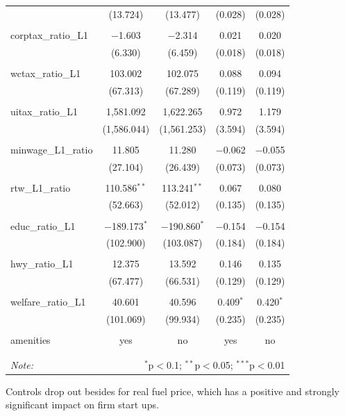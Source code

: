 \documentclass{beamer}
\begin{document}
\begin{frame}
\begin{table}[!htbp]
{{\begin{tabular}{@{\extracolsep{5pt}}lcccc}
  & (13.724) & (13.477) & (0.028) & (0.028) \\ 
  & & & & \\ 
 corptax\_ratio\_L1 & $-$1.603 & $-$2.314 & 0.021 & 0.020 \\ 
  & (6.330) & (6.459) & (0.018) & (0.018) \\ 
  & & & & \\ 
 wctax\_ratio\_L1 & 103.002 & 102.075 & 0.088 & 0.094 \\ 
  & (67.313) & (67.289) & (0.119) & (0.119) \\ 
  & & & & \\ 
 uitax\_ratio\_L1 & 1,581.092 & 1,622.265 & 0.972 & 1.179 \\ 
  & (1,586.044) & (1,561.253) & (3.594) & (3.594) \\ 
  & & & & \\ 
 minwage\_L1\_ratio & 11.805 & 11.280 & $-$0.062 & $-$0.055 \\ 
  & (27.104) & (26.439) & (0.073) & (0.073) \\ 
  & & & & \\ 
 rtw\_L1\_ratio & 110.586$^{**}$ & 113.241$^{**}$ & 0.067 & 0.080 \\ 
  & (52.663) & (52.012) & (0.135) & (0.135) \\ 
  & & & & \\ 
 educ\_ratio\_L1 & $-$189.173$^{*}$ & $-$190.860$^{*}$ & $-$0.154 & $-$0.154 \\ 
  & (102.900) & (103.087) & (0.184) & (0.184) \\ 
  & & & & \\ 
 hwy\_ratio\_L1 & 12.375 & 13.592 & 0.146 & 0.135 \\ 
  & (67.477) & (66.531) & (0.129) & (0.129) \\ 
  & & & & \\ 
 welfare\_ratio\_L1 & 40.601 & 40.596 & 0.409$^{*}$ & 0.420$^{*}$ \\ 
  & (101.069) & (99.934) & (0.235) & (0.235) \\ 
  & & & & \\ 
  amenities & yes & no & yes & no \\
\hline \\[-1.8ex] 
\hline 
\hline \\[-1.8ex] 
\textit{Note:}  & \multicolumn{4}{r}{$^{*}$p$<$0.1; $^{**}$p$<$0.05; $^{***}$p$<$0.01} \\ 
\end{tabular}}} 
\end{table}
Controls drop out besides for real fuel price, which has a positive and strongly significant impact on firm start ups.
\end{frame}
\end{document}
